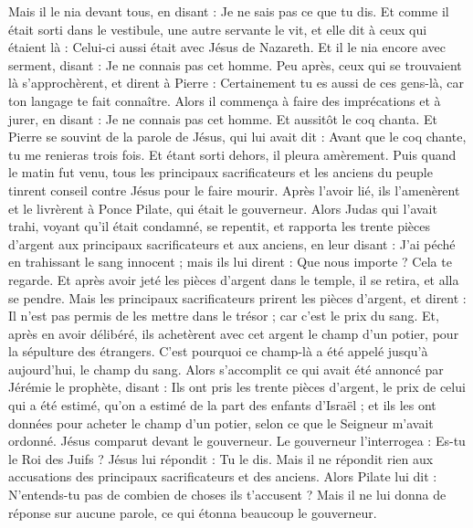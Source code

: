\begin{multicols}{2}
Mais il le nia devant tous, en disant : Je ne sais pas ce que tu dis.
Et comme il était sorti dans le vestibule, une autre servante le vit, et elle dit à ceux qui étaient là : Celui-ci aussi était avec Jésus de Nazareth.
Et il le nia encore avec serment, disant : Je ne connais pas cet homme.
Peu après, ceux qui se trouvaient là s'approchèrent, et dirent à Pierre : Certainement tu es aussi de ces gens-là, car ton langage te fait connaître.
Alors il commença à faire des imprécations et à jurer, en disant : Je ne connais pas cet homme. Et aussitôt le coq chanta.
Et Pierre se souvint de la parole de Jésus, qui lui avait dit : Avant que le coq chante, tu me renieras trois fois. Et étant sorti dehors, il pleura amèrement.
\VerseOne{}Puis quand le matin fut venu, tous les principaux sacrificateurs et les anciens du peuple tinrent conseil contre Jésus pour le faire mourir.
Après l’avoir lié, ils l'amenèrent et le livrèrent à Ponce Pilate, qui était le gouverneur.
Alors Judas qui l'avait trahi, voyant qu'il était condamné, se repentit, et rapporta les trente pièces d'argent aux principaux sacrificateurs et aux anciens,
en leur disant : J’ai péché en trahissant le sang innocent ; mais ils lui dirent : Que nous importe ? Cela te regarde.
Et après avoir jeté les pièces d'argent dans le temple, il se retira, et alla se pendre.
Mais les principaux sacrificateurs prirent les pièces d'argent, et dirent : Il n'est pas permis de les mettre dans le trésor ; car c’est le prix du sang.
Et, après en avoir délibéré, ils achetèrent avec cet argent le champ d'un potier, pour la sépulture des étrangers.
C'est pourquoi ce champ-là a été appelé jusqu'à aujourd'hui, le champ du sang.
Alors s’accomplit ce qui avait été annoncé par Jérémie le prophète, disant : Ils ont pris les trente pièces d'argent, le prix de celui qui a été estimé, qu’on a estimé de la part des enfants d'Israël ;
et ils les ont données pour acheter le champ d'un potier, selon ce que le Seigneur m'avait ordonné.
Jésus comparut devant le gouverneur. Le gouverneur l'interrogea : Es-tu le Roi des Juifs ? Jésus lui répondit : Tu le dis.
Mais il ne répondit rien aux accusations des principaux sacrificateurs et des anciens.
Alors Pilate lui dit : N'entends-tu pas de combien de choses ils t’accusent ?
Mais il ne lui donna de réponse sur aucune parole, ce qui étonna beaucoup le gouverneur.

\end{multicols}
